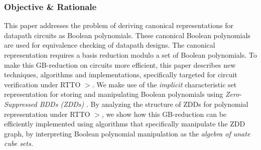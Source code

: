\subsubsection{Objective \& Rationale} This paper addresses the
problem of deriving canonical representations for datapath circuits
as Boolean polynomials. These canonical Boolean polynomials are
used for equivalence checking of datapath designs. The canonical
representation requires a \Grobner basis reduction modulo a set of
Boolean polynomials. 
To make this GB-reduction
on circuits more efficient, this paper describes new techniques,
algorithms and implementations, specifically targeted for 
circuit verification under RTTO $>$.  We make use of
the {\it implicit} characteristic set representation for storing and
manipulating Boolean polynomials using {\it Zero-Suppressed BDDs
(ZDDs)} \cite{zbdd}. By analyzing the {structure of ZDDs} for 
polynomial representation under RTTO $>$, we show how this 
GB-reduction can be efficiently implemented using algorithms that
specifically manipulate the ZDD graph, by interpreting Boolean
polynomial manipulation as the {\it algebra of unate cube sets.}

